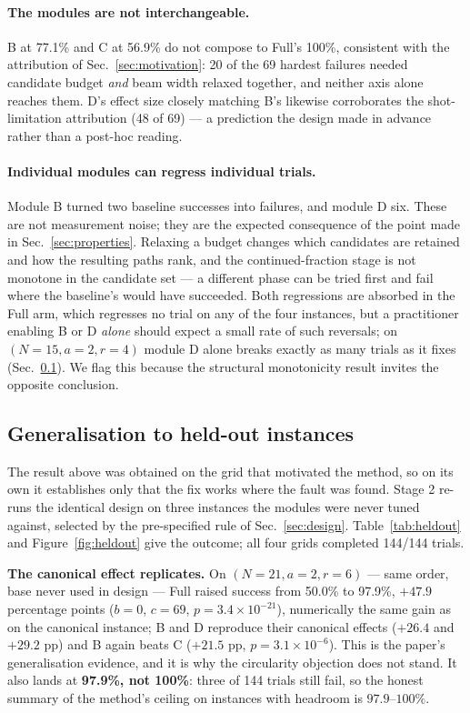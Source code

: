 \documentclass[preprint,11pt]{elsarticle}
\begin{document}
\paragraph{The modules are not interchangeable.} B at 77.1\% and C at
56.9\% do not compose to Full's 100\%, consistent with the attribution of
Sec.~\ref{sec:motivation}: 20 of the 69 hardest failures needed candidate
budget \emph{and} beam width relaxed together, and neither axis alone
reaches them. D's effect size closely matching B's likewise corroborates
the shot-limitation attribution (48 of 69) --- a prediction the design
made in advance rather than a post-hoc reading.

\paragraph{Individual modules can regress individual trials.} Module B
turned two baseline successes into failures, and module D six. These are
not measurement noise; they are the expected consequence of the point
made in Sec.~\ref{sec:properties}. Relaxing a budget changes which
candidates are retained and how the resulting paths rank, and the
continued-fraction stage is not monotone in the candidate set --- a
different phase can be tried first and fail where the baseline's would
have succeeded. Both regressions are absorbed in the Full arm, which
regresses no trial on any of the four instances, but a practitioner
enabling B or D \emph{alone} should expect a small rate of such
reversals; on $(N{=}15,a{=}2,r{=}4)$ module D alone breaks exactly as
many trials as it fixes (Sec.~\ref{sec:heldout}). We flag this because
the structural monotonicity result invites the opposite conclusion.

\subsection{Generalisation to held-out instances}
\label{sec:heldout}

The result above was obtained on the grid that motivated the method, so
on its own it establishes only that the fix works where the fault was
found. Stage 2 re-runs the identical design on three instances the
modules were never tuned against, selected by the pre-specified rule of
Sec.~\ref{sec:design}. Table~\ref{tab:heldout} and
Figure~\ref{fig:heldout} give the outcome; all four grids completed
144/144 trials.

\textbf{The canonical effect replicates.} On $(N{=}21,a{=}2,r{=}6)$ ---
same order, base never used in design --- Full raised success from 50.0\%
to 97.9\%, $+47.9$ percentage points ($b{=}0$, $c{=}69$,
$p=3.4\times10^{-21}$), numerically the same gain as on the canonical
instance; B and D reproduce their canonical effects ($+26.4$ and
$+29.2$ pp) and B again beats C ($+21.5$ pp, $p=3.1\times10^{-6}$). This
is the paper's generalisation evidence, and it is why the circularity
objection does not stand. It also lands at \textbf{97.9\%, not 100\%}:
three of 144 trials still fail, so the honest summary of the method's
ceiling on instances with headroom is $97.9$--$100\%$.
\end{document}
